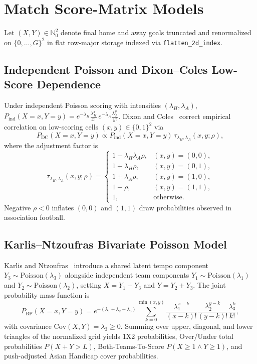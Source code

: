 \documentclass{article}
\begin{document}
\section{Match Score-Matrix Models}
Let $(X, Y) \in \mathbb{N}_0^2$ denote final home and away goals truncated and renormalized on $\{0, \dots, G\}^2$ in flat row-major storage indexed via \texttt{flatten\_2d\_index}.

\subsection{Independent Poisson and Dixon--Coles Low-Score Dependence}
Under independent Poisson scoring with intensities $(\lambda_H, \lambda_A)$, $P_{\text{ind}}(X=x, Y=y) = e^{-\lambda_H}\frac{\lambda_H^x}{x!}\,e^{-\lambda_A}\frac{\lambda_A^y}{y!}$. Dixon and Coles~\cite{dixon1997modelling} correct empirical correlation on low-scoring cells $(x, y) \in \{0, 1\}^2$ via
\begin{equation}
P_{\text{DC}}(X = x, Y = y) \propto P_{\text{ind}}(X = x, Y = y)\,\tau_{\lambda_H, \lambda_A}(x, y; \rho),
\end{equation}
where the adjustment factor is
\begin{equation}
\tau_{\lambda_H, \lambda_A}(x, y; \rho) =
\begin{cases}
1 - \lambda_H \lambda_A \rho, & (x, y) = (0, 0), \\
1 + \lambda_H \rho, & (x, y) = (0, 1), \\
1 + \lambda_A \rho, & (x, y) = (1, 0), \\
1 - \rho, & (x, y) = (1, 1), \\
1, & \text{otherwise.}
\end{cases}
\end{equation}
Negative $\rho < 0$ inflates $(0, 0)$ and $(1, 1)$ draw probabilities observed in association football.

\subsection{Karlis--Ntzoufras Bivariate Poisson Model}
Karlis and Ntzoufras~\cite{karlis2003analysis} introduce a shared latent tempo component $Y_3 \sim \mathrm{Poisson}(\lambda_3)$ alongside independent team components $Y_1 \sim \mathrm{Poisson}(\lambda_1)$ and $Y_2 \sim \mathrm{Poisson}(\lambda_2)$, setting $X = Y_1 + Y_3$ and $Y = Y_2 + Y_3$. The joint probability mass function is
\begin{equation}
P_{\text{BP}}(X = x, Y = y) = e^{-(\lambda_1 + \lambda_2 + \lambda_3)} \sum_{k=0}^{\min(x, y)} \frac{\lambda_1^{x-k}}{(x-k)!}\frac{\lambda_2^{y-k}}{(y-k)!}\frac{\lambda_3^k}{k!},
\end{equation}
with covariance $\mathrm{Cov}(X, Y) = \lambda_3 \ge 0$. Summing over upper, diagonal, and lower triangles of the normalized grid yields 1X2 probabilities, Over/Under total probabilities $P(X + Y > L)$, Both-Teams-To-Score $P(X \ge 1 \wedge Y \ge 1)$, and push-adjusted Asian Handicap cover probabilities.
\end{document}
